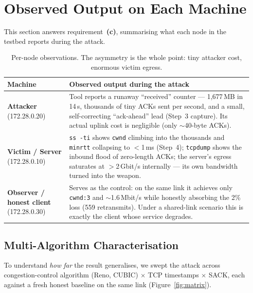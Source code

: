 \documentclass[11pt,a4paper]{article}
\begin{document}
\section{Observed Output on Each Machine}
\label{sec:observed}

This section answers requirement~\textbf{(c)}, summarising what each node in the testbed
reports during the attack.

\begin{table}[h]
\centering\small
\begin{tabular}{@{}p{2.4cm}p{12.2cm}@{}}
\toprule
\textbf{Machine} & \textbf{Observed output during the attack} \\
\midrule
\textbf{Attacker} (172.28.0.20) & Tool reports a runaway ``received'' counter --- 1{,}677\,MB in 14\,s, thousands of tiny ACKs sent per second, and a small, self-correcting ``ack-ahead'' lead (Step~3 capture). Its actual uplink cost is negligible (only $\sim$40-byte ACKs). \\
\addlinespace
\textbf{Victim / Server} (172.28.0.10) & \texttt{ss -ti} shows \texttt{cwnd} climbing into the thousands and \texttt{minrtt} collapsing to $<$1\,ms (Step~4); \texttt{tcpdump} shows the inbound flood of zero-length ACKs; the server's egress saturates at $>$2\,Gbit/s internally --- its own bandwidth turned into the weapon. \\
\addlinespace
\textbf{Observer / honest client} (172.28.0.30) & Serves as the control: on the same link it achieves only \texttt{cwnd:3} and $\sim$1.6\,Mbit/s while honestly absorbing the 2\% loss (559 retransmits). Under a shared-link scenario this is exactly the client whose service degrades. \\
\bottomrule
\end{tabular}
\caption{Per-node observations. The asymmetry is the whole point: tiny attacker cost,
enormous victim egress.}
\end{table}

\subsection{Multi-Algorithm Characterisation}
\label{sec:matrix}
\label{sec:sweep}

To understand \emph{how far} the result generalises, we swept the attack across
congestion-control algorithm (Reno, CUBIC) $\times$ TCP timestamps $\times$ SACK, each
against a fresh honest baseline on the same link (Figure~\ref{fig:matrix}).
\end{document}
